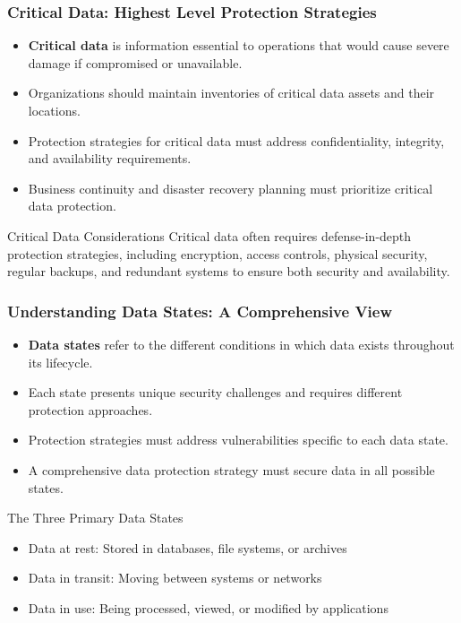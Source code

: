 \documentclass{beamer}
\begin{document}
\begin{frame}
\frametitle{Critical Data: Highest Level Protection Strategies}
\begin{itemize}
\item \textbf{Critical data} is information essential to operations that would cause severe damage if compromised or unavailable.
\item Organizations should maintain inventories of critical data assets and their locations.
\item Protection strategies for critical data must address confidentiality, integrity, and availability requirements.
\item Business continuity and disaster recovery planning must prioritize critical data protection.
\end{itemize}

\begin{alertblock}{Critical Data Considerations}
Critical data often requires defense-in-depth protection strategies, including encryption, access controls, physical security, regular backups, and redundant systems to ensure both security and availability.
\end{alertblock}
\end{frame}
\begin{frame}
\frametitle{Understanding Data States: A Comprehensive View}
\begin{itemize}
\item \textbf{Data states} refer to the different conditions in which data exists throughout its lifecycle.
\item Each state presents unique security challenges and requires different protection approaches.
\item Protection strategies must address vulnerabilities specific to each data state.
\item A comprehensive data protection strategy must secure data in all possible states.
\end{itemize}

\begin{block}{The Three Primary Data States}
\begin{itemize}
\item Data at rest: Stored in databases, file systems, or archives
\item Data in transit: Moving between systems or networks
\item Data in use: Being processed, viewed, or modified by applications
\end{itemize}
\end{block}
\end{frame}
\end{document}
